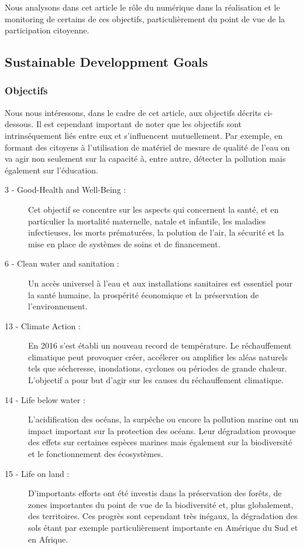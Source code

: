 \documentclass[a4paper,11pt,titlepage]{article}
\begin{document}
		Nous analysons dans cet article le rôle du numérique dans la réalisation et le monitoring de certains de ces objectifs, particulièrement du point de vue de la participation citoyenne.
		 
		\subsection{Sustainable Developpment Goals}
			\subsubsection{Objectifs}
				Nous nous intéressons, dans le cadre de cet article, aux objectifs décrits ci-dessous. Il est cependant important de noter que les objectifs sont intrinséquement liés entre eux et s'influencent mutuellement. Par exemple, en formant des citoyens à l'utilisation de matériel de mesure de qualité de l'eau on va agir non seulement sur la capacité à, entre autre, détecter la pollution mais également sur l'éducation.
				\begin{description}
					\item[ 3 - Good-Health and Well-Being :] Cet objectif se concentre sur les aspects qui	concernent la santé, et en particulier la mortalité maternelle, natale et infantile, les maladies infectieuses, les morts prématurées, la polution de l'air, la sécurité et la mise en place de systèmes de soins et de financement.
					\item[ 6 - Clean water and sanitation :] Un accès universel à l'eau et aux installations sanitaires est essentiel pour la santé humaine, la prospérité économique et la préservation de l'environnement.
					\item[13 - Climate Action :] En 2016 s'est établi un nouveau record de température. Le réchauffement climatique peut provoquer créer, accélerer ou amplifier les aléas	naturels tels que sécheresse, inondations, cyclones ou périodes de grande chaleur. L'objectif a pour but d'agir sur les causes du réchauffement climatique.
					\item[14 - Life below water :] L'acidification des océans, la surpêche ou encore la pollution marine ont un impact important sur la protection des océans. Leur dégradation provoque des effets sur certaines espèces marines mais également sur la biodiversité et le fonctionnement des écosystèmes.
					\item[15 - Life on land :] D'importants efforts ont été investis dans la préservation des forêts, de zones importantes du point de vue de la biodiversité et, plus globalement, des territoires. Ces progrès sont cependant très inégaux, la dégradation des sols étant par exemple particulièrement importante en Amérique du Sud et en Afrique.
				\end{description}
\end{document}
